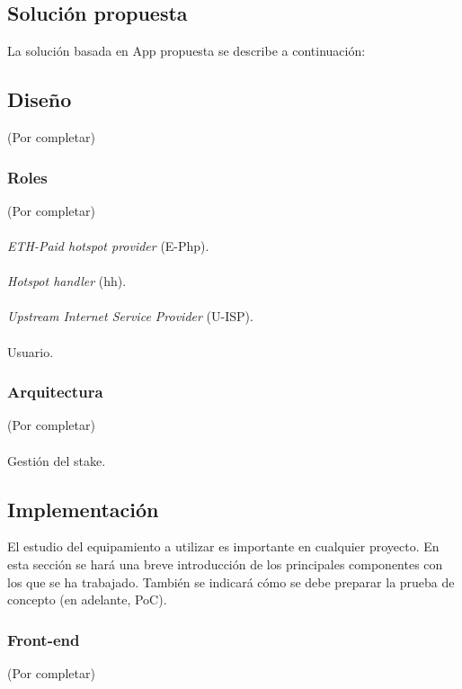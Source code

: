 \documentclass[9pt,oneside]{amsart}
\begin{document}
\begin{multicols}{2}
\section{Solución propuesta}\label{sec:solution}
La solución basada en \DH App propuesta se describe a continuación:
\subsection{Diseño} \label{ch:design}
(Por completar)
\subsubsection{Roles} \label{ch:roles}
(Por completar)
\\
\\
\textit{ETH-Paid hotspot provider} (E-Php).
\\
\\
\textit{Hotspot handler} (hh).
\\
\\
\textit{Upstream Internet Service Provider} (U-ISP).
\\
\\
Usuario.
\subsubsection{Arquitectura} \label{ch:architecture}
(Por completar)
\\
\\
Gestión del stake.
\subsection{Implementación} \label{ch:implementation}
El estudio del equipamiento a utilizar es importante en cualquier proyecto. En esta sección se hará una breve introducción de los principales componentes con los que se ha trabajado. También se indicará cómo se debe preparar la prueba de concepto (en adelante, PoC).
\subsubsection{Front-end} \label{ch:front-end}
(Por completar)

\end{multicols}
\end{document}
